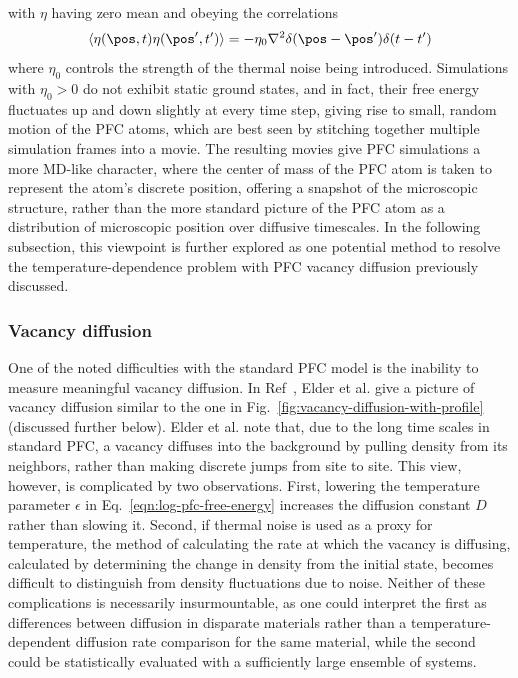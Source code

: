 %
with $\eta$ having zero mean and obeying the correlations
%
\begin{align}\label{eqn:stochastic-noise}
\langle \eta(\pos, t)\eta(\pos', t') \rangle = -\eta_0 \nabla^2 \delta(\pos - \pos')\delta(t-t')
\end{align}
%
where $\eta_0$ controls the strength of the thermal noise being introduced.  Simulations with $\eta_0 > 0$ do not exhibit static ground states, and in fact, their free energy fluctuates up and down slightly at every time step, giving rise to small, random motion of the PFC atoms, which are best seen by stitching together multiple simulation frames into a movie.  The resulting movies give PFC simulations a more MD-like character, where the center of mass of the PFC atom is taken to represent the atom's discrete position, offering a snapshot of the microscopic structure, rather than the more standard picture of the PFC atom as a distribution of microscopic position over diffusive timescales.  In the following subsection, this viewpoint is further explored as one potential method to resolve the temperature-dependence problem with PFC vacancy diffusion previously discussed.

\subsubsection{Vacancy diffusion}

One of the noted difficulties with the standard PFC model is the inability to measure meaningful vacancy diffusion.  In Ref~\cite{elder2002modeling}, Elder et al. give a picture of vacancy diffusion similar to the one in Fig.~\ref{fig:vacancy-diffusion-with-profile} (discussed further below).  Elder et al. note that, due to the long time scales in standard PFC, a vacancy diffuses into the background by pulling density from its neighbors, rather than making discrete jumps from site to site.  This view, however, is complicated by two observations.  First, lowering the temperature parameter $\epsilon$ in Eq.~\ref{eqn:log-pfc-free-energy} increases the diffusion constant $D$ rather than slowing it.  Second, if thermal noise is used as a proxy for temperature, the method of calculating the rate at which the vacancy is diffusing, calculated by determining the change in density from the initial state, becomes difficult to distinguish from density fluctuations due to noise.  Neither of these complications is necessarily insurmountable, as one could interpret the first as differences between diffusion in disparate materials rather than a temperature-dependent diffusion rate comparison for the same material, while the second could be statistically evaluated with a sufficiently large ensemble of systems.

